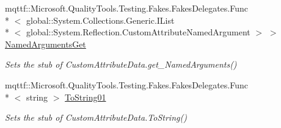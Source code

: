 \begin{DoxyCompactItemize}
mqttf\-::\-Microsoft.\-Quality\-Tools.\-Testing.\-Fakes.\-Fakes\-Delegates.\-Func\\*
$<$ global\-::\-System.\-Collections.\-Generic.\-I\-List\\*
$<$ global\-::\-System.\-Reflection.\-Custom\-Attribute\-Named\-Argument $>$ $>$ \hyperlink{class_system_1_1_reflection_1_1_fakes_1_1_stub_custom_attribute_data_aae8cc17ce6723853d5fbe80a760244e3}{Named\-Arguments\-Get}
\begin{DoxyCompactList}\small\item\em Sets the stub of Custom\-Attribute\-Data.\-get\-\_\-\-Named\-Arguments()\end{DoxyCompactList}\item 
mqttf\-::\-Microsoft.\-Quality\-Tools.\-Testing.\-Fakes.\-Fakes\-Delegates.\-Func\\*
$<$ string $>$ \hyperlink{class_system_1_1_reflection_1_1_fakes_1_1_stub_custom_attribute_data_aca3e76e2362e150da74bda53adecb43b}{To\-String01}
\begin{DoxyCompactList}\small\item\em Sets the stub of Custom\-Attribute\-Data.\-To\-String()\end{DoxyCompactList}\end{DoxyCompactItemize}
